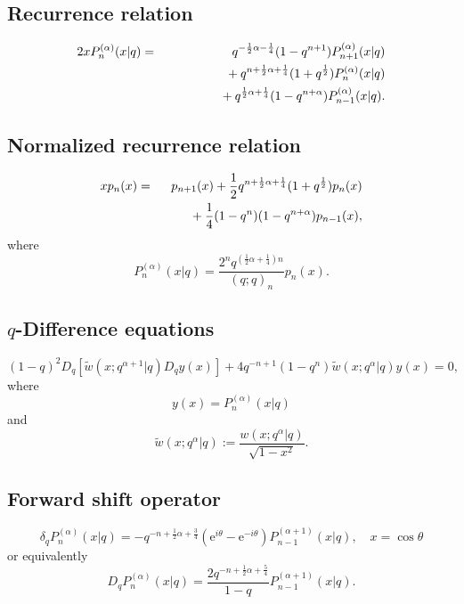 \documentclass[envcountchap,graybox]{svmono}
\newcommand{\mathindent}{\hspace{7.5mm}}
\newcommand{\e}{\textrm{e}}
\begin{document}
{{\newpage

\subsection*{Recurrence relation}
\begin{eqnarray}
\label{RecContqLaguerre}
2xP_n^{(\alpha)}(x|q)&=&q^{-\frac{1}{2}\alpha-\frac{1}{4}}(1-q^{n+1})P_{n+1}^{(\alpha)}(x|q)\nonumber\\
& &{}\mathindent{}+q^{n+\frac{1}{2}\alpha+\frac{1}{4}}(1+q^{\frac{1}{2}})P_n^{(\alpha)}(x|q)\nonumber\\
& &{}\mathindent\mathindent{}+q^{\frac{1}{2}\alpha+\frac{1}{4}}(1-q^{n+\alpha})P_{n-1}^{(\alpha)}(x|q).
\end{eqnarray}

\subsection*{Normalized recurrence relation}
\begin{eqnarray}
\label{NormRecContqLaguerre}
xp_n(x)&=&p_{n+1}(x)+\frac{1}{2}q^{n+\frac{1}{2}\alpha+\frac{1}{4}}(1+q^{\frac{1}{2}})p_n(x)\nonumber\\
& &{}\mathindent{}+\frac{1}{4}(1-q^n)(1-q^{n+\alpha})p_{n-1}(x),
\end{eqnarray}
where
$$P_n^{(\alpha)}(x|q)=\frac{2^nq^{(\frac{1}{2}\alpha+\frac{1}{4})n}}{(q;q)_n}p_n(x).$$

\subsection*{$q$-Difference equations}
\begin{equation}
\label{dvContqLaguerre}
(1-q)^2D_q\left[{\tilde w}(x;q^{\alpha+1}|q)D_qy(x)\right]
+4q^{-n+1}(1-q^n){\tilde w}(x;q^{\alpha}|q)y(x)=0,
\end{equation}
where
$$y(x)=P_n^{(\alpha)}(x|q)$$
and
$${\tilde w}(x;q^{\alpha}|q):=\frac{w(x;q^{\alpha}|q)}{\sqrt{1-x^2}}.$$

\subsection*{Forward shift operator}
\begin{equation}
\label{shift1ContqLaguerreI}
\delta_qP_n^{(\alpha)}(x|q)=-q^{-n+\frac{1}{2}\alpha+\frac{3}{4}}
(\e^{i\theta}-\e^{-i\theta})P_{n-1}^{(\alpha+1)}(x|q),\quad x=\cos\theta
\end{equation}
or equivalently
\begin{equation}
\label{shift1ContqLaguerreII}
D_qP_n^{(\alpha)}(x|q)=\frac{2q^{-n+\frac{1}{2}\alpha+\frac{5}{4}}}{1-q}
P_{n-1}^{(\alpha+1)}(x|q).
\end{equation}

}}
\end{document}
